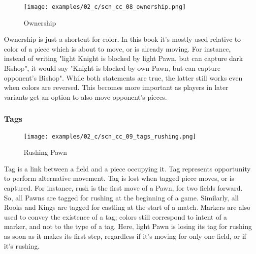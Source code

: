 \vspace*{-0.7\baselineskip}
\noindent
\begin{wrapfigure}[15]{l}{0.4\textwidth}
\centering
\texttt{[image: examples/02\_c/scn\_cc\_08\_ownership.png]}
\vspace*{-1.4\baselineskip}
\caption{Ownership}
\label{fig:scn_cc_08_ownership}
\end{wrapfigure}
Ownership is just a shortcut for color. In this book it's mostly used relative
to color of a piece which is about to move, or is already moving.\newline
\indent
For instance, instead of writing "light Knight is blocked by light Pawn, but can
capture dark Bishop", it would say "Knight is blocked by own Pawn, but can capture
opponent's Bishop". While both statements are true, the latter still works even
when colors are reversed. This becomes more important as players in later variants
get an option to also move opponent's pieces.

\clearpage %

\subsubsection*{Tags}
\label{sec:Classical Chess/Chessboard/Examples/Tags}

\vspace*{-0.7\baselineskip}
\noindent
\begin{wrapfigure}[16]{l}{0.4\textwidth}
\centering
\texttt{[image: examples/02\_c/scn\_cc\_09\_tags\_rushing.png]}
\vspace*{-1.4\baselineskip}
\caption{Rushing Pawn}
\label{fig:scn_cc_09_tags_rushing}
\end{wrapfigure}
Tag is a link between a field and a piece occupying it. Tag represents
opportunity to perform alternative movement. Tag is lost when tagged
piece moves, or is captured.\newline
\indent
For instance, rush is the first move of a Pawn, for two fields forward.
So, all Pawns are tagged for rushing at the beginning of a game. Similarly,
all Rooks and Kings are tagged for castling at the start of a match.\newline
\indent
Markers are also used to convey the existence of a tag; colors still
correspond to intent of a marker, and not to the type of a tag.\newline
\indent
Here, light Pawn is losing its tag for rushing as soon as it makes its
first step, regardless if it's moving for only one field, or if it's
rushing.


